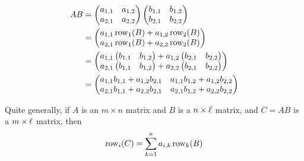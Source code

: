 \documentclass{ximera}
\begin{document}
\begin{align*}AB &= \begin{pmatrix}
a_{1,1} & a_{1,2}\\
a_{2,1} & a_{2,2}
\end{pmatrix}
\begin{pmatrix}
b_{1,1} & b_{1,2}\\
b_{2,1} & b_{2,2}
\end{pmatrix}\\
&= \begin{pmatrix}
a_{1,1}\operatorname{row}_1(B) + a_{1,2}\operatorname{row}_2(B) \\ a_{2,1}\operatorname{row}_1(B) +  a_{2,2}\operatorname{row}_2(B)
\end{pmatrix}\\
&= \begin{pmatrix}
a_{1,1}\begin{pmatrix} b_{1,1} & b_{1,2}\end{pmatrix} + a_{1,2}\begin{pmatrix} b_{2,1} & b_{2,2}\end{pmatrix} \\ a_{2,1}\begin{pmatrix} b_{1,1} & b_{1,2}\end{pmatrix} +  a_{2,2}\begin{pmatrix} b_{2,1} & b_{2,2}\end{pmatrix}
\end{pmatrix}\\
&= \begin{pmatrix}
a_{1,1}b_{1,1} + a_{1,2}b_{2,1} & a_{1,1}b_{1,2}+ a_{1,2}b_{2,2}\\
a_{2,1}b_{1,1} + a_{2,2}b_{2,1} & a_{2,1}b_{1,2} + a_{2,2}b_{2,2}
\end{pmatrix}
\end{align*}

Quite generally, if $A$ is an $m\times n$ matrix and $B$ is a $n\times
\ell$ matrix, and $C = AB$ is a $m\times \ell$ matrix, then
\[
\operatorname{row}_i(C) = \sum_{k=1}^n a_{i,k}\operatorname{row}_k(B)
\]
\end{document}
